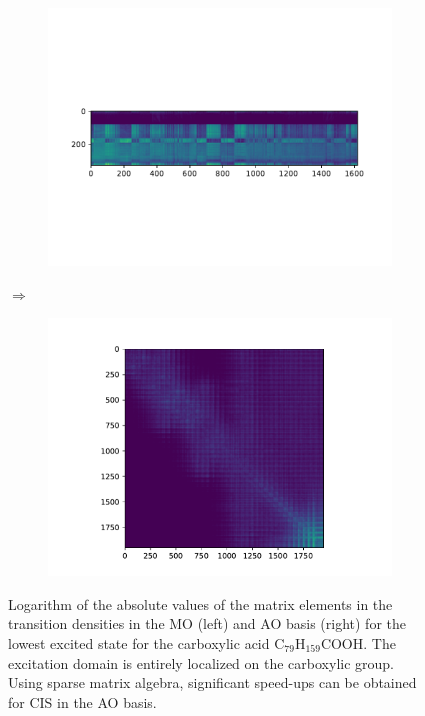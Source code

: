 \begin{figure}
\centering
\begin{subfigure}{0.3\linewidth}
\centering
\includegraphics[scale=0.6]{Pics/CISDENSE}
\caption{}
\end{subfigure}
$\Longrightarrow$
\begin{subfigure}{0.6\linewidth}
\centering
\includegraphics[scale=0.6]{Pics/CIS}
\caption{}
\end{subfigure}
\caption[Logarithm of the absolute values of the matrix elements in the transition densities in the MO and AO basis for the lowest excited state for the carboxylic acid C$_{79}$H$_{159}$COOH.]{Logarithm of the absolute values of the matrix elements in the transition densities in the MO (left) and AO basis (right) for the lowest excited state for the carboxylic acid C$_{79}$H$_{159}$COOH. The excitation domain is entirely localized on the carboxylic group. Using sparse matrix algebra, significant speed-ups can be obtained for CIS in the AO basis.}
\label{fig:CISDENSE}
\end{figure}

